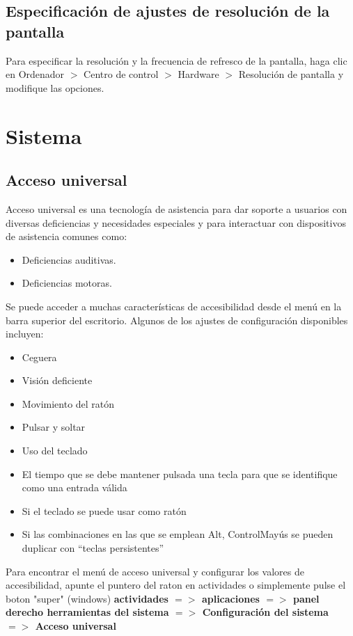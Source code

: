 \documentclass[12pt,letterpaper]{book}
\begin{document}
\subsection{Especificación de ajustes de resolución de la pantalla}
Para especificar la resolución y la frecuencia de refresco de la pantalla, haga clic en Ordenador $>$ Centro de control $>$ Hardware $>$ Resolución de pantalla y modifique las
opciones.
\section{Sistema}
\subsection{Acceso universal}

Acceso universal es una tecnología de asistencia para dar soporte a usuarios con diversas deficiencias y necesidades especiales y para interactuar con dispositivos de asistencia comunes como:
\begin{itemize}
\item Deficiencias auditivas.
\item Deficiencias motoras.
\end{itemize} 
Se puede acceder a muchas características de accesibilidad desde el menú en la barra superior del escritorio.
Algunos de los ajustes de configuración disponibles incluyen:
\begin{itemize}
\item Ceguera
\item Visión deficiente
\item Movimiento del ratón
\item Pulsar y soltar
\item Uso del teclado
\item El tiempo que se debe mantener pulsada una tecla para que se identifique como
una entrada válida
\item Si el teclado se puede usar como ratón
\item Si las combinaciones en las que se emplean Alt, ControlMayús se pueden duplicar con “teclas persistentes”
\end{itemize}
Para encontrar el menú de acceso universal y configurar los valores de accesibilidad, apunte el puntero del raton en actividades o simplemente pulse el boton "super" (windows) {\bf actividades $=>$ aplicaciones $=>$ panel derecho herramientas del sistema $=>$ Configuración del sistema $=>$ Acceso universal}\\
\end{document}

